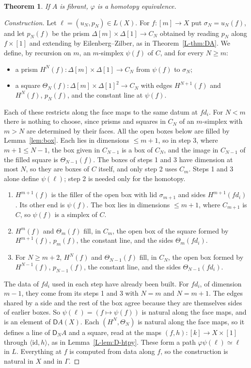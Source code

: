 \documentclass[11pt]{article}
\newcommand{\id}{\mathrm{id}}
\newcommand{\D}{\mathsf{D}}
\theoremstyle{plain}
\newtheorem{theorem}{Theorem}[section]
\theoremstyle{definition}
\theoremstyle{remark}
\begin{document}
\begin{theorem}\label{thm:conv}
If $A$ is fibrant, $\varphi$ is a homotopy equivalence.
\end{theorem}

\begin{proof}[Construction]
Let $\ell=(u_N,p_N)\in L(X)$. For $f:[m]\to X$ put $\sigma_N=u_N(f)$, and
let $p_N(f)$ be the prism $\Delta[m]\times\Delta[1]\to C_N$ obtained by
reading $p_N$ along $f\times[1]$ and extending by Eilenberg--Zilber, as in
Theorem~\ref{L-thm:DA}. We define, by recursion on $m$, an
$m$-simplex $\psi(f)$ of $C$, and for every $N\ge m$:
\begin{itemize}
\item a prism $H^N(f):\Delta[m]\times\Delta[1]\to C_N$ from $\psi(f)$ to
  $\sigma_N$;
\item a square $\Theta_N(f):\Delta[m]\times\Delta[1]^2\to C_N$ with edges
  $H^{N+1}(f)$ and $H^N(f)$, $p_N(f)$, and the constant line at $\psi(f)$.
\end{itemize}
Each of these restricts along the face maps to the same datum at $fd_i$.
For $N<m$ there is nothing to choose, since prisms and squares in $C_N$ of
an $m$-simplex with $m>N$ are determined by their faces. All the open boxes
below are filled by Lemma~\ref{lem:box}. Each lies in dimensions $\le m+1$, so in
step 3, where $m+1\le N-1$, the box given in $C_{N-1}$ is a box of $C_N$, and
the image in $C_{N-1}$ of the filled square is $\Theta_{N-1}(f)$. The boxes of
steps 1 and 3 have dimension at most $N$, so they are boxes of $C$ itself, and
only step 2 uses $C_m$. Steps 1 and 3 alone define $\psi(\ell)$; step 2 is
needed only for the homotopy.
\begin{enumerate}
\item $H^{m+1}(f)$ is the filler of the open box with lid $\sigma_{m+1}$
  and sides $H^{m+1}(fd_i)$. Its other end is $\psi(f)$. The box lies in
  dimensions $\le m+1$, where $C_{m+1}$ is $C$, so $\psi(f)$ is a simplex
  of $C$.
\item $H^m(f)$ and $\Theta_m(f)$ fill, in $C_m$, the open box of the square
  formed by $H^{m+1}(f)$, $p_m(f)$, the constant line, and the sides
  $\Theta_m(fd_i)$.
\item For $N\ge m+2$, $H^N(f)$ and $\Theta_{N-1}(f)$ fill, in $C_N$, the
  open box formed by $H^{N-1}(f)$, $p_{N-1}(f)$, the constant line, and the
  sides $\Theta_{N-1}(fd_i)$.
\end{enumerate}
The data of $fd_i$ used in each step have already been built. For $fd_i$,
of dimension $m-1$, they come from its steps 1 and 3 with $N=m$ and
$N=m+1$. The edges shared by a side and the rest of the box agree because
they are themselves sides of earlier boxes. So $\psi(\ell)=(f\mapsto\psi(f))$
is natural along the face maps, and is an element of $\D A(X)$. Each
$(H^N,\Theta_N)$ is natural along the face maps, so it defines a line of
$\D_NA$ and a square, read at the maps $(f,h):[k]\to X\times[1]$ through
$\langle\id,h\rangle$, as in Lemma~\ref{L-lem:D-htpy}. These form a path
$\varphi\psi(\ell)\simeq\ell$ in $L$. Everything at $f$ is computed from
data along $f$, so the construction is natural in $X$ and in $\Gamma$.


\end{proof}
\end{document}
